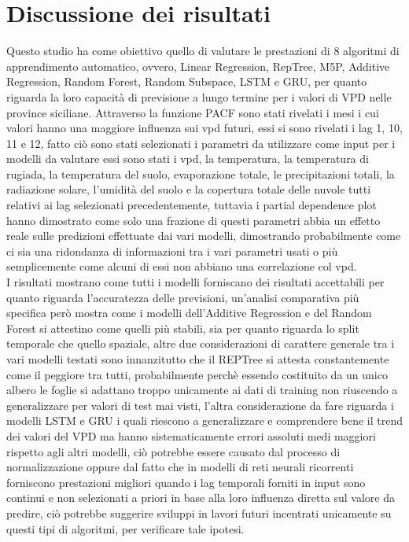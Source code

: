 \section{Discussione dei risultati}
Questo studio ha come obiettivo quello di valutare le prestazioni di 8 algoritmi di apprendimento automatico, ovvero, Linear Regression, RepTree, M5P, Additive Regression, Random Forest, Random Subspace, LSTM e GRU, per quanto riguarda la loro capacità di previsione a lungo termine per i valori di VPD nelle province siciliane.
Attraverso la funzione PACF sono stati rivelati i mesi i cui valori hanno una maggiore influenza sui vpd futuri, essi si sono rivelati i lag 1, 10, 11 e 12, fatto ciò sono stati selezionati i parametri da utilizzare come input per i modelli da valutare essi sono stati i vpd, la temperatura, la temperatura di rugiada, la temperatura del suolo, evaporazione totale, le precipitazioni totali, la radiazione solare, l'umidità del suolo e la copertura totale delle nuvole tutti relativi ai lag selezionati precedentemente, tuttavia i partial dependence plot hanno dimostrato come solo una frazione di questi parametri abbia un effetto reale sulle predizioni effettuate dai vari modelli, dimostrando probabilmente come ci sia una ridondanza di informazioni tra i vari parametri usati o più semplicemente come alcuni di essi non abbiano una correlazione col vpd.\\
I risultati mostrano come tutti i modelli forniscano dei risultati accettabili per quanto riguarda l'accuratezza delle previsioni, un'analisi comparativa più specifica però mostra come i modelli dell'Additive Regression e del Random Forest si attestino come quelli più stabili, sia per quanto riguarda lo split temporale che quello spaziale, altre due considerazioni di carattere generale tra i vari modelli testati sono innanzitutto che il REPTree si attesta constantemente come il peggiore tra tutti, probabilmente perchè essendo costituito da un unico albero le foglie si adattano troppo unicamente ai dati di training non riuscendo a generalizzare per valori di test mai visti, l'altra considerazione da fare riguarda i modelli LSTM e GRU i quali riescono a generalizzare e comprendere bene il trend dei valori del VPD ma hanno sistematicamente errori assoluti medi maggiori rispetto agli altri modelli, ciò potrebbe essere causato dal processo di normalizzazione oppure dal fatto che in modelli di reti neurali ricorrenti forniscono prestazioni migliori quando i lag temporali forniti in input sono continui e non selezionati a priori in base alla loro influenza diretta sul valore da predire, ciò potrebbe suggerire sviluppi in lavori futuri incentrati unicamente su questi tipi di algoritmi, per verificare tale ipotesi.\\
